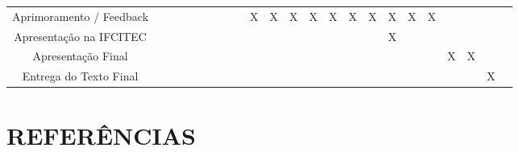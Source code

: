 \documentclass[12pt,a4paper]{article}
\begin{document}
{{\begin{tabular}{| c | c *{10}{ c | c } c|}
					 Aprimoramento / Feedback  &   &   &   &   &   &   &   &   & X & X & X & X & X & X & X & X & X & X &   &   &   &   \\
					 Apresentação na IFCITEC   &   &   &   &   &   &   &   &   &   &   &   &   &   &   &   & X &   &   &   &   &   &   \\
					 Apresentação Final        &   &   &   &   &   &   &   &   &   &   &   &   &   &   &   &   &   &   & X & X &   &   \\
					 Entrega do Texto Final    &   &   &   &   &   &   &   &   &   &   &   &   &   &   &   &   &   &   &   &   & X &   \\
					 \hline
				\end{tabular}
			}
		}
	\newpage
	\section*{REFERÊNCIAS}

		\printbibliography[heading=none]

		\newpage
\end{document}
